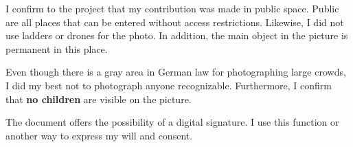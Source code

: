 \documentclass[parskip=half]{scrreprt}
\begin{document}
\begin{contract}
	I confirm to the project that my contribution was made in public space. Public are all places that can be entered without access restrictions. Likewise, I did not use ladders or drones for the photo.
	In addition, the main object in the picture is permanent in this place.
	
	Even though there is a gray area in German law for photographing large crowds, I did my best not to photograph anyone recognizable. Furthermore, I confirm that \textbf{no children} are visible on the picture.
	
	The document offers the possibility of a digital signature. I use this function or another way to express my will and consent.
	
	\begin{Form}
	\end{Form}
	
\end{contract}
\end{document}
